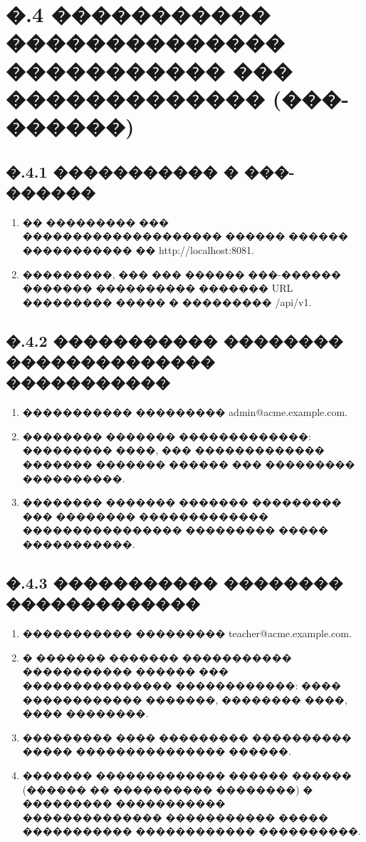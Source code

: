 \section*{�.4 ����������� �������������� ����������� ��� ������������� (���-������)}

\subsection*{�.4.1 ����������� � ���-������}

\begin{enumerate}
  \item �� ��������� ��� �������������������� ������ ������ ����������� �� http://localhost:8081.
  \item ���������, ��� ��� ������ ���-������ ������� ���������� ������� URL ��������� ����� � ��������� /api/v1.
\end{enumerate}

\subsection*{�.4.2 ����������� �������� �������������� �����������}

\begin{enumerate}
  \item ����������� ��������� admin@acme.example.com.
  \item �������� ������� �������������: ��������� ����, ��� ������������� ������� ������� ������ ��� ��������� ����������.
  \item �������� ������� ������� ��������� ��� �������� ������������� ���������������� ��������� ����� �����������.
\end{enumerate}

\subsection*{�.4.3 ����������� �������� �������������}

\begin{enumerate}
  \item ����������� ��������� teacher@acme.example.com.
  \item � ������� ������� ����������� ����������� ������ ��� ��������������� ������������: ���� ������������ �������, �������� ����, ���� ��������.
  \item ��������� ���� ��������� ���������� ����� ��������������� ������.
  \item ������� ������������� ������ ������ (������ �� ���������� ��������) � ��������� ����������� �������������� ����������� ����� ����������� ������������ ����������.
\end{enumerate}

